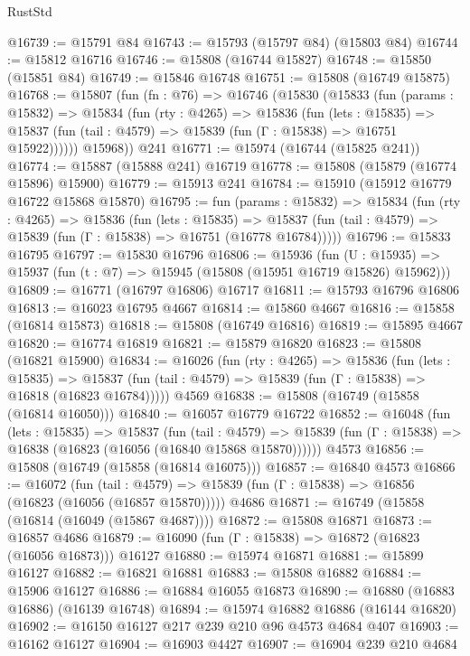 \begin{lexlean}{RustStd}
\begin{coremodule}
@16739 := @15791 @84
@16743 := @15793 (@15797 @84) (@15803 @84)
@16744 := @15812 @16716
@16746 := @15808 (@16744 @15827)
@16748 := @15850 (@15851 @84)
@16749 := @15846 @16748
@16751 := @15808 (@16749 @15875)
@16768 := @15807
    (fun (fn : @76) =>
    @16746
      (@15830
        (@15833
          (fun (params : @15832) =>
          @15834
            (fun (rty : @4265) =>
            @15836
              (fun (lets : @15835) =>
              @15837 (fun (tail : @4579) => @15839 (fun (Γ : @15838) => @16751 @15922))))))
        @15968))
    @241
@16771 := @15974 (@16744 (@15825 @241))
@16774 := @15887 (@15888 @241) @16719
@16778 := @15808 (@15879 (@16774 @15896) @15900)
@16779 := @15913 @241
@16784 := @15910 (@15912 @16779 @16722 @15868 @15870)
@16795 := fun (params : @15832) =>
  @15834
    (fun (rty : @4265) =>
    @15836
      (fun (lets : @15835) =>
      @15837 (fun (tail : @4579) => @15839 (fun (Γ : @15838) => @16751 (@16778 @16784)))))
@16796 := @15833 @16795
@16797 := @15830 @16796
@16806 := @15936
    (fun (U : @15935) => @15937 (fun (t : @7) => @15945 (@15808 (@15951 @16719 @15826) @15962)))
@16809 := @16771 (@16797 @16806) @16717
@16811 := @15793 @16796 @16806
@16813 := @16023 @16795 @4667
@16814 := @15860 @4667
@16816 := @15858 (@16814 @15873)
@16818 := @15808 (@16749 @16816)
@16819 := @15895 @4667
@16820 := @16774 @16819
@16821 := @15879 @16820
@16823 := @15808 (@16821 @15900)
@16834 := @16026
    (fun (rty : @4265) =>
    @15836
      (fun (lets : @15835) =>
      @15837 (fun (tail : @4579) => @15839 (fun (Γ : @15838) => @16818 (@16823 @16784)))))
    @4569
@16838 := @15808 (@16749 (@15858 (@16814 @16050)))
@16840 := @16057 @16779 @16722
@16852 := @16048
    (fun (lets : @15835) =>
    @15837
      (fun (tail : @4579) =>
      @15839 (fun (Γ : @15838) => @16838 (@16823 (@16056 (@16840 @15868 @15870))))))
    @4573
@16856 := @15808 (@16749 (@15858 (@16814 @16075)))
@16857 := @16840 @4573
@16866 := @16072
    (fun (tail : @4579) => @15839 (fun (Γ : @15838) => @16856 (@16823 (@16056 (@16857 @15870)))))
    @4686
@16871 := @16749 (@15858 (@16814 (@16049 (@15867 @4687))))
@16872 := @15808 @16871
@16873 := @16857 @4686
@16879 := @16090 (fun (Γ : @15838) => @16872 (@16823 (@16056 @16873))) @16127
@16880 := @15974 @16871
@16881 := @15899 @16127
@16882 := @16821 @16881
@16883 := @15808 @16882
@16884 := @15906 @16127
@16886 := @16884 @16055 @16873
@16890 := @16880 (@16883 @16886) (@16139 @16748)
@16894 := @15974 @16882 @16886 (@16144 @16820)
@16902 := @16150 @16127 @217 @239 @210 @96 @4573 @4684 @407
@16903 := @16162 @16127
@16904 := @16903 @4427
@16907 := @16904 @239 @210 @4684

\end{coremodule}
\end{lexlean}
